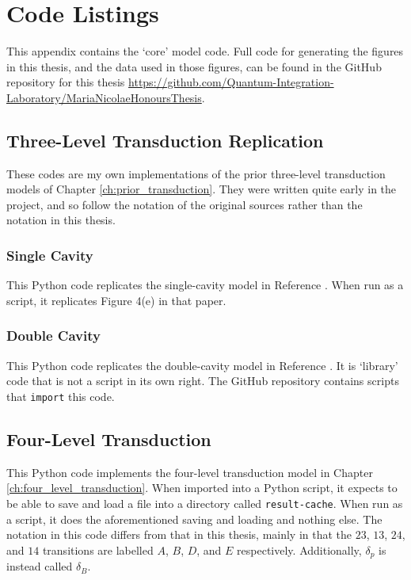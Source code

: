 \chapter{\label{ap:printed_code}Code Listings}

This appendix contains the `core' model code. Full code for generating the figures in this thesis, and the data used in those figures, can be found in the GitHub repository for this thesis \url{https://github.com/Quantum-Integration-Laboratory/MariaNicolaeHonoursThesis}.

\section{Three-Level Transduction Replication}
These codes are my own implementations of the prior three-level transduction models of Chapter \ref{ch:prior_transduction}. They were written quite early in the project, and so follow the notation of the original sources rather than the notation in this thesis.

\subsection{Single Cavity}
This Python code replicates the single-cavity model in Reference \cite{fernandez-gonzalvo_2019}. When run as a script, it replicates Figure 4(e) in that paper.


\subsection{Double Cavity}
This Python code replicates the double-cavity model in Reference \cite{barnett_longdell_2020}. It is `library' code that is not a script in its own right. The GitHub repository contains scripts that \texttt{import} this code.


\section{Four-Level Transduction}
This Python code implements the four-level transduction model in Chapter \ref{ch:four_level_transduction}. When imported into a Python script, it expects to be able to save and load a file into a directory called \texttt{result-cache}. When run as a script, it does the aforementioned saving and loading and nothing else. The notation in this code differs from that in this thesis, mainly in that the $23$, $13$, $24$, and $14$ transitions are labelled $A$, $B$, $D$, and $E$ respectively. Additionally, $\delta_p$ is instead called $\delta_B$.


